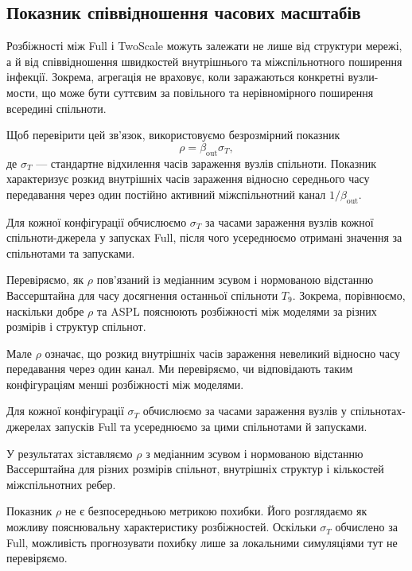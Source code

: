 \subsection{Показник співвідношення часових масштабів}
\label{sec:descriptor}

Розбіжності між Full і TwoScale можуть залежати
не лише від структури мережі, а й від співвідношення
швидкостей внутрішнього та міжспільнотного
поширення інфекції. Зокрема, агрегація
не враховує, коли заражаються конкретні
вузли-мости, що може бути суттєвим
за повільного та нерівномірного
поширення всередині спільноти.

Щоб перевірити цей зв'язок, використовуємо
безрозмірний показник
\begin{equation}
\label{eq:rho}
\rho=\beta_{\mathrm{out}}\sigma_T,
\end{equation}
де $\sigma_T$ --- стандартне відхилення
часів зараження вузлів спільноти.
Показник характеризує розкид внутрішніх
часів зараження відносно середнього часу
передавання через один постійно активний
міжспільнотний канал $1/\beta_{\mathrm{out}}$.

Для кожної конфігурації обчислюємо
$\sigma_T$ за часами зараження вузлів
кожної спільноти-джерела у запусках Full,
після чого усереднюємо отримані значення
за спільнотами та запусками.

Перевіряємо, як $\rho$ пов'язаний
із медіанним зсувом і нормованою відстанню
Вассерштайна для часу досягнення останньої
спільноти $T_9$. Зокрема, порівнюємо,
наскільки добре $\rho$ та ASPL пояснюють
розбіжності між моделями за різних
розмірів і структур спільнот.

Мале $\rho$ означає, що розкид внутрішніх
часів зараження невеликий відносно часу
передавання через один канал.
Ми перевіряємо, чи відповідають таким
конфігураціям менші розбіжності між моделями.

Для кожної конфігурації $\sigma_T$
обчислюємо за часами зараження вузлів
у спільнотах-джерелах запусків Full
та усереднюємо за цими спільнотами
й запусками.

У результатах зіставляємо $\rho$
з медіанним зсувом і нормованою відстанню
Вассерштайна для різних розмірів спільнот,
внутрішніх структур і кількостей
міжспільнотних ребер.

Показник $\rho$ не є безпосередньою метрикою
похибки. Його розглядаємо як можливу
пояснювальну характеристику розбіжностей.
Оскільки $\sigma_T$ обчислено за Full,
можливість прогнозувати похибку лише
за локальними симуляціями тут не перевіряємо.




